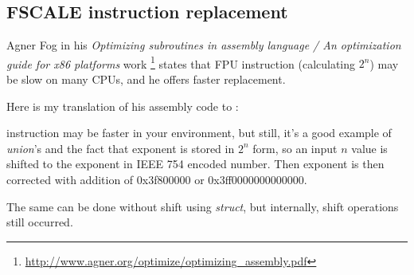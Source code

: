 \subsection{FSCALE instruction replacement}

Agner Fog in his \emph{Optimizing subroutines in assembly language / An optimization guide for x86 platforms} work
\footnote{\url{http://www.agner.org/optimize/optimizing_assembly.pdf}} states that  \ac{FPU} instruction
(calculating $2^n$) may be slow on many CPUs, and he offers faster replacement.

Here is my translation of his assembly code to \CCpp:



 instruction may be faster in your environment, but still, it's a good example of \emph{union}'s and the fact
that exponent is stored in $2^n$ form,
so an input $n$ value is shifted to the exponent in IEEE 754 encoded number.
Then exponent is then corrected with addition of 0x3f800000 or 0x3ff0000000000000.

The same can be done without shift using \emph{struct}, but internally, shift operations still occurred.


